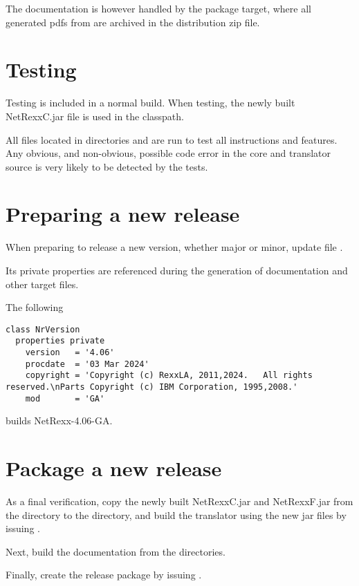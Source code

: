 The documentation is however handled by the package target, where all generated pdfs from
 are archived in the \nr{}
distribution zip file.

\section{Testing}
Testing is included in a normal build. When testing, the newly built NetRexxC.jar file is used in the classpath.

All \nr{} files located in directories  and  are run to test all instructions and features.
Any obvious, and non-obvious, possible code error in the \nr{} core and translator source is very likely to be detected by the tests.

\section{Preparing a new release}
When preparing to release a new version, whether major or minor, update file .

Its private properties  are referenced during the generation of documentation and
other target files.

The following
\begin{lstlisting}
class NrVersion
  properties private
    version   = '4.06'
    procdate  = '03 Mar 2024'
    copyright = 'Copyright (c) RexxLA, 2011,2024.   All rights reserved.\nParts Copyright (c) IBM Corporation, 1995,2008.'
    mod       = 'GA'
\end{lstlisting}

builds NetRexx-4.06-GA.
\section{Package a new release}
As a final verification, copy the newly built NetRexxC.jar and NetRexxF.jar from the  directory
to the  directory, and build the \nr{} translator using the new jar files by issuing
.

Next, build the documentation from the  directories.

Finally, create the release package by issuing .

